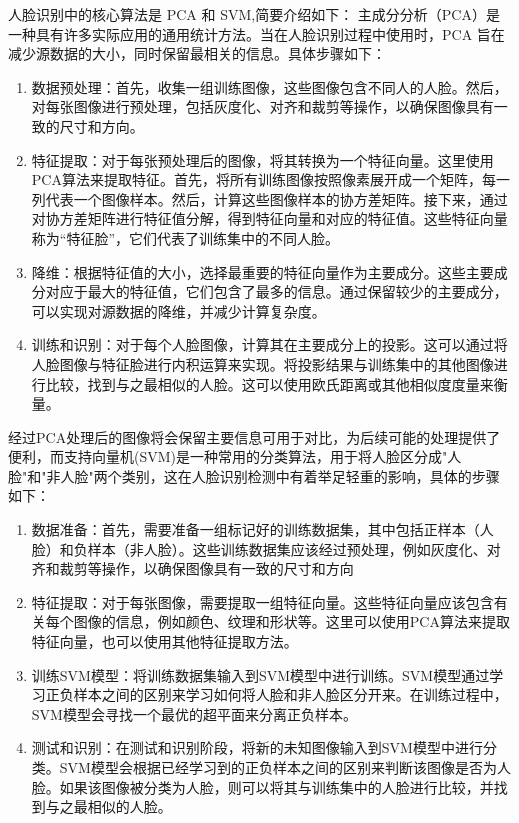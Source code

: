 \documentclass{article}
\begin{document}
人脸识别中的核心算法是 PCA 和 SVM,简要介绍如下：
主成分分析（PCA）是一种具有许多实际应用的通用统计方法。当在人脸识别过程中使用时，PCA 旨在减少源数据的大小，同时保留最相关的信息。具体步骤如下：

\begin{enumerate}
    \item 数据预处理：首先，收集一组训练图像，这些图像包含不同人的人脸。然后，对每张图像进行预处理，包括灰度化、对齐和裁剪等操作，以确保图像具有一致的尺寸和方向。
    \item 特征提取：对于每张预处理后的图像，将其转换为一个特征向量。这里使用PCA算法来提取特征。首先，将所有训练图像按照像素展开成一个矩阵，每一列代表一个图像样本。然后，计算这些图像样本的协方差矩阵。接下来，通过对协方差矩阵进行特征值分解，得到特征向量和对应的特征值。这些特征向量称为“特征脸”，它们代表了训练集中的不同人脸。
    \item 降维：根据特征值的大小，选择最重要的特征向量作为主要成分。这些主要成分对应于最大的特征值，它们包含了最多的信息。通过保留较少的主要成分，可以实现对源数据的降维，并减少计算复杂度。
    \item 训练和识别：对于每个人脸图像，计算其在主要成分上的投影。这可以通过将人脸图像与特征脸进行内积运算来实现。将投影结果与训练集中的其他图像进行比较，找到与之最相似的人脸。这可以使用欧氏距离或其他相似度度量来衡量。
\end{enumerate}

经过PCA处理后的图像将会保留主要信息可用于对比，为后续可能的处理提供了便利，而支持向量机(SVM)是一种常用的分类算法，用于将人脸区分成"人脸"和"非人脸"两个类别，这在人脸识别检测中有着举足轻重的影响，具体的步骤如下：

\begin{enumerate}
    \item 数据准备：首先，需要准备一组标记好的训练数据集，其中包括正样本（人脸）和负样本（非人脸）。这些训练数据集应该经过预处理，例如灰度化、对齐和裁剪等操作，以确保图像具有一致的尺寸和方向
    \item 特征提取：对于每张图像，需要提取一组特征向量。这些特征向量应该包含有关每个图像的信息，例如颜色、纹理和形状等。这里可以使用PCA算法来提取特征向量，也可以使用其他特征提取方法。
    \item 训练SVM模型：将训练数据集输入到SVM模型中进行训练。SVM模型通过学习正负样本之间的区别来学习如何将人脸和非人脸区分开来。在训练过程中，SVM模型会寻找一个最优的超平面来分离正负样本。
    \item 测试和识别：在测试和识别阶段，将新的未知图像输入到SVM模型中进行分类。SVM模型会根据已经学习到的正负样本之间的区别来判断该图像是否为人脸。如果该图像被分类为人脸，则可以将其与训练集中的人脸进行比较，并找到与之最相似的人脸。
\end{enumerate}
\end{document}

